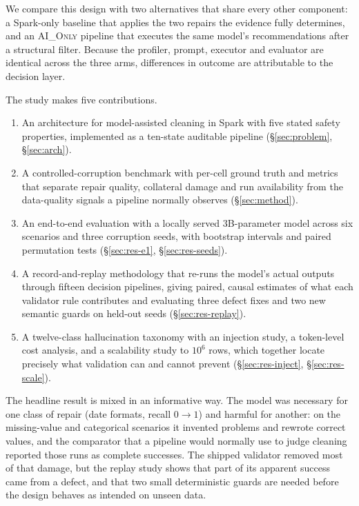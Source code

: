 We compare this design with two alternatives that share every other component: a Spark-only baseline that applies the two repairs the evidence fully determines, and an \textsc{AI\_Only} pipeline that executes the same model's recommendations after a structural filter. Because the profiler, prompt, executor and evaluator are identical across the three arms, differences in outcome are attributable to the decision layer.

The study makes five contributions.
\begin{enumerate}[leftmargin=*,nosep]
  \item An architecture for model-assisted cleaning in Spark with five stated safety properties, implemented as a ten-state auditable pipeline (\S\ref{sec:problem}, \S\ref{sec:arch}).
  \item A controlled-corruption benchmark with per-cell ground truth and metrics that separate repair quality, collateral damage and run availability from the data-quality signals a pipeline normally observes (\S\ref{sec:method}).
  \item An end-to-end evaluation with a locally served 3B-parameter model across six scenarios and three corruption seeds, with bootstrap intervals and paired permutation tests (\S\ref{sec:res-e1}, \S\ref{sec:res-seeds}).
  \item A record-and-replay methodology that re-runs the model's actual outputs through fifteen decision pipelines, giving paired, causal estimates of what each validator rule contributes and evaluating three defect fixes and two new semantic guards on held-out seeds (\S\ref{sec:res-replay}).
  \item A twelve-class hallucination taxonomy with an injection study, a token-level cost analysis, and a scalability study to $10^6$ rows, which together locate precisely what validation can and cannot prevent (\S\ref{sec:res-inject}, \S\ref{sec:res-scale}).
\end{enumerate}

The headline result is mixed in an informative way. The model was necessary for one class of repair (date formats, recall $0\to1$) and harmful for another: on the missing-value and categorical scenarios it invented problems and rewrote correct values, and the comparator that a pipeline would normally use to judge cleaning reported those runs as complete successes. The shipped validator removed most of that damage, but the replay study shows that part of its apparent success came from a defect, and that two small deterministic guards are needed before the design behaves as intended on unseen data.

